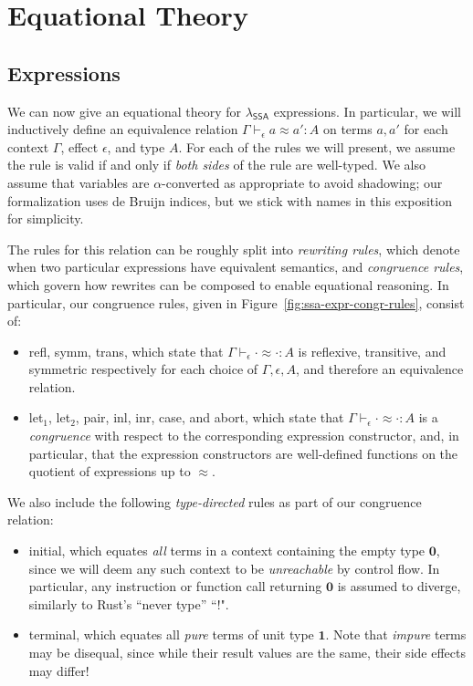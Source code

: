 \documentclass[acmsmall,screen,review]{acmart}
\newcommand{\mb}[1]{\ensuremath{\mathbf{#1}}}
\newcommand{\ms}[1]{\ensuremath{\mathsf{#1}}}
\newcommand{\teqv}{\approx}
\newcommand{\tmeq}[5]{#1 \vdash_{#2} #3 \teqv #4 : {#5}}
\newcommand{\brle}[1]{{\textsf{#1}}}
\newcommand{\isotopessa}{\(\lambda_{\ms{SSA}}\)}
\begin{document}
\section{Equational Theory}

\label{sec:equations}

\subsection{Expressions}

We can now give an equational theory for \isotopessa{} expressions. In particular,
we will inductively define an equivalence relation
$
\tmeq{\Gamma}{\epsilon}{a}{a'}{A}
$
on terms $a, a'$ for each context $\Gamma$, effect $\epsilon$, and type $A$. For each of the rules
we will present, we assume the rule is valid if and only if \emph{both sides} of the rule are
well-typed. We also assume that variables are $\alpha$-converted as appropriate to avoid shadowing;
our formalization uses de Bruijn indices, but we stick with names in this exposition for simplicity.

The rules for this relation can be roughly split into \emph{rewriting rules}, which denote when two
particular expressions have equivalent semantics, and \emph{congruence rules}, which govern how
rewrites can be composed to enable equational reasoning. In particular, our congruence rules, given
in Figure~\ref{fig:ssa-expr-congr-rules}, consist of:
\begin{itemize}
  \item \brle{refl}, \brle{symm}, \brle{trans}, which state that
  $\tmeq{\Gamma}{\epsilon}{\cdot}{\cdot}{A}$ is reflexive, transitive, and symmetric respectively
  for each choice of $\Gamma, \epsilon, A$, and therefore an equivalence relation.
  \item \brle{let$_1$}, \brle{let$_2$}, \brle{pair}, \brle{inl}, \brle{inr}, \brle{case}, and
  \brle{abort}, which state that $\tmeq{\Gamma}{\epsilon}{\cdot}{\cdot}{A}$ is a \emph{congruence}
  with respect to the corresponding expression constructor, and, in particular, that the expression
  constructors are well-defined functions on the quotient of expressions up to $\teqv$.
\end{itemize} 
We also include the following \emph{type-directed} rules as part of our congruence relation:
\begin{itemize}
  \item \brle{initial}, which equates \emph{all} terms in a context containing the empty type
  $\mb{0}$, since we will deem any such context to be \emph{unreachable} by control flow. In
  particular, any instruction or function call returning $\mb{0}$ is assumed to diverge, similarly
  to Rust's ``never type'' ``$!$".
  \item \brle{terminal}, which equates all \emph{pure} terms of unit type $\mb{1}$. Note that
  \emph{impure} terms may be disequal, since while their result values are the same, their side
  effects may differ!
\end{itemize}
\end{document}
